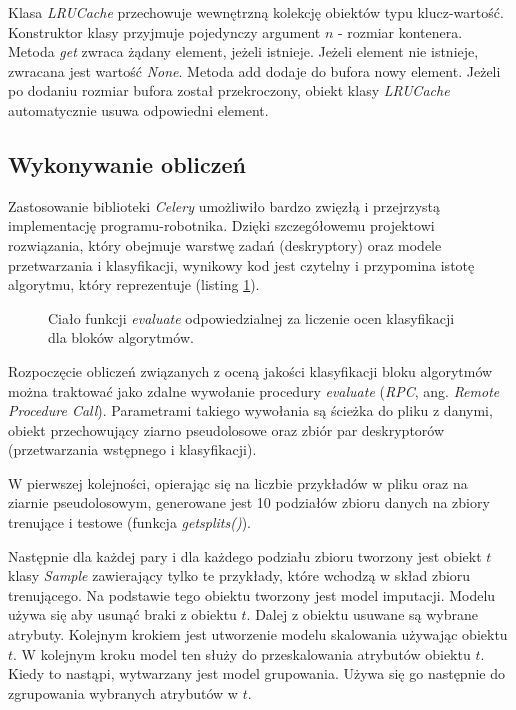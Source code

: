 \documentclass[../thesis.tex]{subfiles}
\begin{document}
Klasa \emph{LRUCache} przechowuje wewnętrzną kolekcję obiektów typu klucz-wartość. Konstruktor klasy przyjmuje pojedynczy argument $n$ - rozmiar kontenera. Metoda \emph{get} zwraca żądany element, jeżeli istnieje. Jeżeli element nie istnieje, zwracana jest wartość \emph{None}. Metoda add dodaje do bufora nowy element. Jeżeli po dodaniu rozmiar bufora został przekroczony, obiekt klasy \emph{LRUCache} automatycznie usuwa odpowiedni element.

\subsection{Wykonywanie obliczeń}

Zastosowanie biblioteki \emph{Celery} umożliwiło bardzo zwięzłą i przejrzystą implementację programu-robotnika. Dzięki szczegółowemu projektowi rozwiązania, który obejmuje warstwę zadań (deskryptory) oraz modele przetwarzania i klasyfikacji, wynikowy kod jest czytelny i przypomina istotę algorytmu, który reprezentuje (listing \ref{impl:snippet_worker}).

\begin{figure}[h]
\centering
{}

\caption{Ciało funkcji \emph{evaluate} odpowiedzialnej za liczenie ocen klasyfikacji dla bloków algorytmów.}
\label{impl:snippet_worker}
\end{figure}

Rozpoczęcie obliczeń związanych z oceną jakości klasyfikacji bloku algorytmów można traktować jako zdalne wywołanie procedury \emph{evaluate} (\emph{RPC}, ang. \emph{Remote Procedure Call}). Parametrami takiego wywołania są ścieżka do pliku z danymi, obiekt przechowujący ziarno pseudolosowe oraz zbiór par deskryptorów (przetwarzania wstępnego i klasyfikacji).

W pierwszej kolejności, opierając się na liczbie przykładów w pliku oraz na ziarnie pseudolosowym, generowane jest 10 podziałów zbioru danych na zbiory trenujące i testowe (funkcja \emph{get\textunderscore splits()}).

Następnie dla każdej pary i dla każdego podziału zbioru tworzony jest obiekt $t$ klasy \emph{Sample} zawierający tylko te przykłady, które wchodzą w skład zbioru trenującego. Na podstawie tego obiektu tworzony jest model imputacji. Modelu używa się aby usunąć braki z obiektu $t$. Dalej z obiektu usuwane są wybrane atrybuty. Kolejnym krokiem jest utworzenie modelu skalowania używając obiektu $t$. W kolejnym kroku model ten służy do przeskalowania atrybutów obiektu $t$. Kiedy to nastąpi, wytwarzany jest model grupowania. Używa się go następnie do zgrupowania wybranych atrybutów w $t$.
\end{document}

